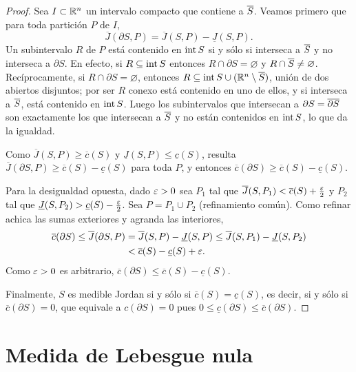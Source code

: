 \begin{proof}
  Sea \(I \subset \mathbb{R}^n\) un intervalo compacto que contiene a \(\overline{S}\). Veamos primero que para toda partición \(P\) de \(I\),
  \[
    \overline{J}(\partial S, P) = \overline{J}(S, P) - \underline{J}(S, P).
  \]
  Un subintervalo \(R\) de \(P\) está contenido en \(\operatorname{int} S\) si y sólo si interseca a \(\overline{S}\) y no interseca a \(\partial S\). En efecto, si \(R \subseteq \operatorname{int} S\) entonces \(R \cap \partial S = \varnothing\) y \(R \cap \overline{S} \neq \varnothing\). Recíprocamente, si \(R \cap \partial S = \varnothing\), entonces \(R \subseteq \operatorname{int} S \cup (\mathbb{R}^n \setminus \overline{S})\), unión de dos abiertos disjuntos; por ser \(R\) conexo está contenido en uno de ellos, y si interseca a \(\overline{S}\), está contenido en \(\operatorname{int} S\). Luego los subintervalos que intersecan a \(\partial S = \overline{\partial S}\) son exactamente los que intersecan a \(\overline{S}\) y no están contenidos en \(\operatorname{int} S\), lo que da la igualdad.

  Como \(\overline{J}(S, P) \geq \overline{c}(S)\) y \(\underline{J}(S, P) \leq \underline{c}(S)\), resulta \(\overline{J}(\partial S, P) \geq \overline{c}(S) - \underline{c}(S)\) para toda \(P\), y entonces \(\overline{c}(\partial S) \geq \overline{c}(S) - \underline{c}(S)\).

  Para la desigualdad opuesta, dado \(\varepsilon > 0\) sea \(P_1\) tal que \(\overline{J}(S, P_1) < \overline{c}(S) + \frac{\varepsilon}{2}\) y \(P_2\) tal que \(\underline{J}(S, P_2) > \underline{c}(S) - \frac{\varepsilon}{2}\). Sea \(P = P_1 \cup P_2\) (refinamiento común). Como refinar achica las sumas exteriores y agranda las interiores,
  \begin{align*}
    \overline{c}(\partial S) \leq \overline{J}(\partial S, P) & = \overline{J}(S, P) - \underline{J}(S, P) \leq \overline{J}(S, P_1) - \underline{J}(S, P_2) \\
                                                              & < \overline{c}(S) - \underline{c}(S) + \varepsilon.
  \end{align*}
  Como \(\varepsilon > 0\) es arbitrario, \(\overline{c}(\partial S) \leq \overline{c}(S) - \underline{c}(S)\).

  Finalmente, \(S\) es medible Jordan si y sólo si \(\overline{c}(S) = \underline{c}(S)\), es decir, si y sólo si \(\overline{c}(\partial S) = 0\), que equivale a \(c(\partial S) = 0\) pues \(0 \leq \underline{c}(\partial S) \leq \overline{c}(\partial S)\).
\end{proof}

\section{Medida de Lebesgue nula}

